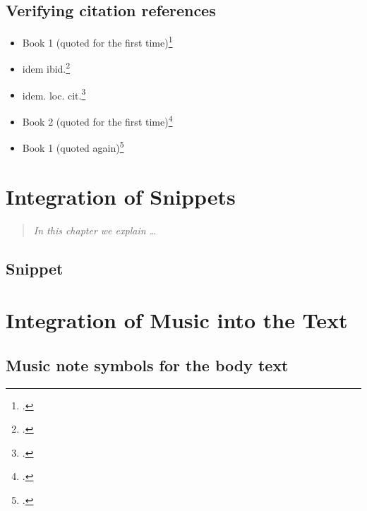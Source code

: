 \documentclass[
  DIV=calc,
  BCOR=5mm,
  11pt,
  headings=small,
  oneside,
  abstract=true,
  toc=bib,
  ngerman,english]{scrbook}
\begin{document}
\section{Verifying citation references}
\begin{itemize}
  \item Book 1 (quoted for the first time)\footcite[vgl.][15]{Grabner1974a}
  \item idem ibid.\footcite[cf.][15]{Grabner1974a}
  \item idem. loc. cit.\footcite[vgl.][23]{Grabner1974a}
  \item Book 2 (quoted for the first time)\footcite[vgl.][15]{Delamotte2011a}
  \item Book 1 (quoted again)\footcite[vgl.][15]{Grabner1974a}
\end{itemize}

\chapter{Integration of Snippets}
\begin{quote}\itshape
In this chapter we explain \ldots
\end{quote}

\section{Snippet}


\chapter{Integration of Music into the Text}


\section{Music note symbols for the body text}
\end{document}
